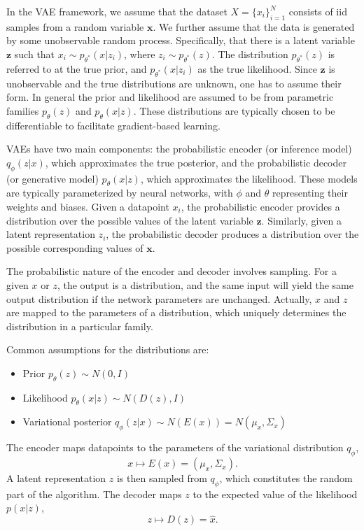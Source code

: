 \documentclass[../../thesis.tex]{subfiles}
\begin{document}
In the VAE framework, we assume that the dataset $X = \{x_i\}_{i=1}^{N}$ consists of iid samples from a random variable $\mathbf{x}$. We further assume that the data is generated by some unobservable random process. Specifically, that there is a latent variable $\mathbf{z}$ such that $x_i \sim p_{\theta^*}(x|z_i)$, where $z_i \sim p_{\theta^*}(z)$. The distribution $p_{\theta^*}(z)$ is referred to at the true prior, and $p_{\theta^*}(x|z_i)$ as the true likelihood. Since $\mathbf{z}$ is unobservable and the true distributions are unknown, one has to assume their form. In general the prior and likelihood are assumed to be from parametric families $p_{\theta}(z)$ and $p_{\theta}(x|z)$. These distributions are typically chosen to be differentiable to facilitate gradient-based learning.\newline

VAEs have two main components: the probabilistic encoder (or inference model) $q_\phi(z|x)$, which approximates the true posterior, and the probabilistic decoder (or generative model) $p_\theta(x|z)$, which approximates the likelihood. These models are typically parameterized by neural networks, with $\phi$ and $\theta$ representing their weights and biases. Given a datapoint $x_i$, the probabilistic encoder provides a distribution over the possible values of the latent variable $\mathbf{z}$. Similarly, given a latent representation $z_i$, the probabilistic decoder produces a distribution over the possible corresponding values of $\mathbf{x}$. \newline

The probabilistic nature of the encoder and decoder involves sampling. For a given $x$ or $z$, the output is a distribution, and the same input will yield the same output distribution if the network parameters are unchanged. Actually, $x$ and $z$ are mapped to the parameters of a distribution, which uniquely determines the distribution in a particular family.\newline

Common assumptions for the distributions are:
\begin{itemize}
    \item Prior $p_\theta(z)\sim N(0,I)$
    \item Likelihood $p_\theta(x|z)\sim N(D(z), I)$
    \item Variational posterior $q_\phi(z|x)\sim N(E(x)) = N(\mu_x, \Sigma_x)$
\end{itemize}
The encoder maps datapoints to the parameters of the variational distribution $q_\phi$, 
$$x \mapsto E(x) = (\mu_x, \Sigma_x).$$ 
A latent representation $z$ is then sampled from $q_\phi$, which constitutes the random part of the algorithm. The decoder maps $z$ to the expected value of the likelihood $p(x|z)$, 
$$z \mapsto D(z) = \widehat{x}.$$ 
\end{document}
